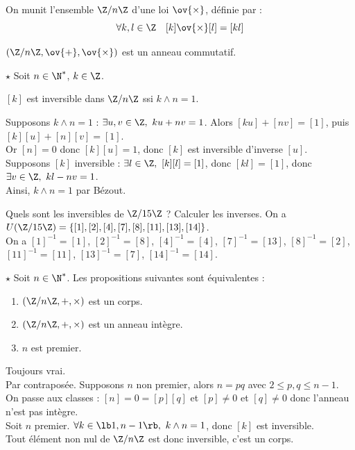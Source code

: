 \documentclass[11pt]{article}
\begin{document}
\begin{defi}{}{}
    On munit l'ensemble $\Z/n\Z$ d'une loi $\ov{\times}$, définie par :
    \begin{equation*}
        \forall k,l \in \Z \quad [k]\ov{\times}[l]=[kl]
    \end{equation*} 
\end{defi}

\vspace*{-0.4cm}

\begin{thm}{}{}
    $(\Z/n\Z,\ov{+},\ov{\times})$ est un anneau commutatif.
\end{thm}

\vspace*{-0.4cm}

\begin{thm}{$\star$}{}
    Soit $n\in\N^*$, $k\in\Z$.
    \begin{center}
        $[k]$ est inversible dans $\Z/n\Z$ ssi $k\land n = 1$.
    \end{center}
    \tcblower
    \boxed{\ra} Supposons $k\land n = 1$ : $\exists u,v \in \Z, ~ ku+nv=1$. Alors $[ku]+[nv]=[1]$, puis $[k][u]+[n][v]=[1]$.\\
    Or $[n]=0$ donc $[k][u]=1$, donc $[k]$ est inversible d'inverse $[u]$.\\
    \boxed{\la} Supposons $[k]$ inversible : $\exists l \in \Z, ~ [k][l]=[1]$, donc $[kl]=[1]$, donc $\exists v \in \Z, ~ kl-nv=1$.\\
    Ainsi, $k\land n = 1$ par Bézout.
\end{thm}

\begin{ex}{}{}
    Quels sont les inversibles de $\Z/15\Z$ ? Calculer les inverses.
    \tcblower
    On a $U(\Z/15\Z)=\{[1],[2],[4],[7],[8],[11],[13],[14]\}$.\\
    On a $[1]^{-1}=[1]$, $[2]^{-1}=[8]$, $[4]^{-1}=[4]$, $[7]^{-1}=[13]$, $[8]^{-1}=[2]$, $[11]^{-1}=[11]$, $[13]^{-1}=[7]$, $[14]^{-1}=[14]$.
\end{ex}

\begin{prop}{$\star$}{}
    Soit $n\in\N^*$. Les propositions suivantes sont équivalentes :
    \begin{enumerate}
        \item $(\Z/n\Z,+,\times)$ est un corps.
        \item $(\Z/n\Z,+,\times)$ est un anneau intègre.
        \item $n$ est premier. 
    \end{enumerate}
    \tcblower
     Toujours vrai.\\
     Par contraposée. Supposons $n$ non premier, alors $n=pq$ avec $2\leq p,q \leq n-1$.\\
    On passe aux classes : $[n]=0=[p][q]$ et $[p]\neq0$ et $[q]\neq0$ donc l'anneau n'est pas intègre. \\
     Soit $n$ premier. $\forall k \in \lb1,n-1\rb, ~ k \land n = 1$, donc $[k]$ est inversible.\\
    Tout élément non nul de $\Z/n\Z$ est donc inversible, c'est un corps.
\end{prop}
\end{document}
